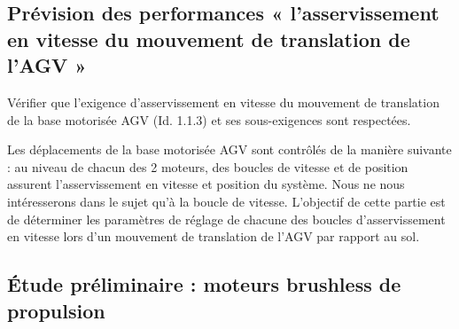 

\subsection{Prévision des performances « l’asservissement en vitesse du mouvement de translation de
l’AGV »}

\begin{obj}
Vérifier que l’exigence d’asservissement en vitesse du mouvement de translation de la base motorisée AGV (Id. 1.1.3) et ses sous-exigences sont respectées.
\end{obj}

Les déplacements de la base motorisée AGV sont contrôlés de la manière suivante : au niveau de
chacun des 2 moteurs, des boucles de vitesse et de position assurent l’asservissement en vitesse et
position du système. Nous ne nous intéresserons dans le sujet qu’à la boucle de vitesse. L’objectif de
cette partie est de déterminer les paramètres de réglage de chacune des boucles d’asservissement en
vitesse lors d’un mouvement de translation de l’AGV par rapport au sol.

\subsection*{Étude préliminaire : moteurs brushless de propulsion}

